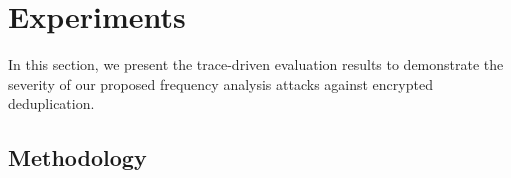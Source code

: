 \documentclass[bachelor]{thesis-uestc}
\begin{document}







\chapter{Experiments}
\label{sec:experiment}

In this section, we present the trace-driven evaluation results to demonstrate
the severity of our proposed frequency analysis attacks against encrypted
deduplication.

\section{Methodology}
\label{sec:dataset}
\end{document}
